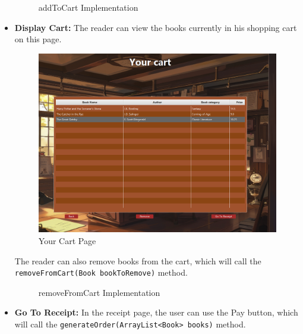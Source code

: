 \documentclass[a4paper,14pt]{extarticle}
\begin{document}
\begin{itemize}
\begin{figure}[H]
        \caption{addToCart Implementation}
    \end{figure}
\newpage
    \item \textbf{Display Cart:} The reader can view the books currently in his shopping cart on this page.
    \begin{figure}[H]
        \centering
        \includegraphics[width=\textwidth]{Media/Your Cart.png}
        \caption{Your Cart Page}
    \end{figure}

    The reader can also remove books from the cart, which will call the 
    \texttt{remove\-From\-Cart(Book bookToRemove)} method.

            \begin{figure}[H]
    \centering
        \caption{removeFromCart Implementation}
\end{figure}

    
\newpage
    \item \textbf{Go To Receipt:} In the receipt page, the user can use the Pay button, which will call the 
    \texttt{generate\-Order(ArrayList<Book> books)} method.
    

\end{itemize}
\end{document}
